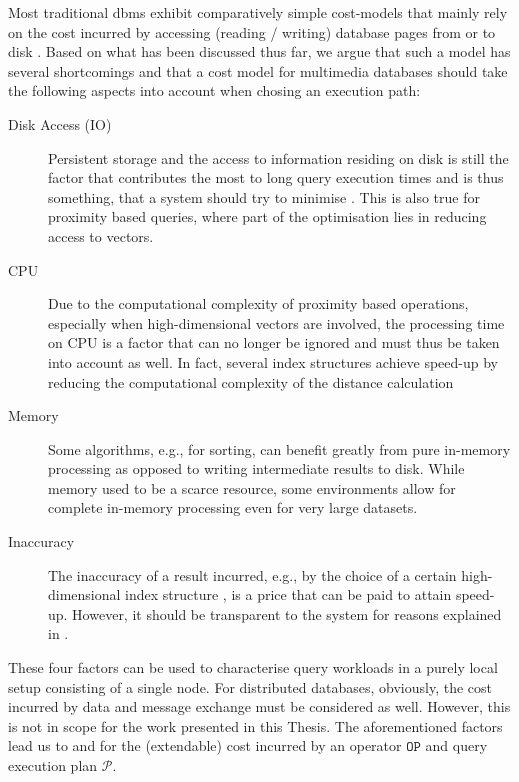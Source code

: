 Most traditional \acrshort{dbms} exhibit comparatively simple cost-models that mainly rely on the cost incurred by accessing (reading / writing) database pages from or to disk . Based on what has been discussed thus far, we argue that such a model has several shortcomings and that a cost model for multimedia databases should take the following aspects into account when chosing an execution path:

\begin{description}
    \item[Disk Access (IO)] Persistent storage and the access to information residing on disk is still the factor that contributes the most to long query execution times and is thus something, that a system should try to minimise \cite{Selinger:1979Access}. This is also true for proximity based queries, where part of the optimisation lies in reducing access to vectors.
    \item[CPU] Due to the computational complexity of proximity based operations, especially when high-dimensional vectors are involved, the processing time on CPU is a factor that can no longer be ignored and must thus be taken into account as well. In fact, several index structures achieve speed-up by reducing the computational complexity of the distance calculation \cite{Weber:1998Va,Jegou:2010Product}
    \item[Memory] Some algorithms, e.g., for sorting, can benefit greatly from pure in-memory processing as opposed to writing intermediate results to disk. While memory used to be a scarce resource, some environments allow for complete in-memory processing even for very large datasets.
    \item[Inaccuracy] The inaccuracy of a result incurred, e.g., by the choice of a certain high-dimensional index structure \cite{Indyk1998:Approximate,Jegou:2010Product}, is a price that can be paid to attain speed-up. However, it should be transparent to the system for reasons explained in .
\end{description}

These four factors can be used to characterise query workloads in a purely local setup consisting of a single node. For distributed databases, obviously, the cost incurred by data and message exchange must be considered as well. However, this is not in scope for the work presented in this Thesis. The aforementioned factors lead us to  and   for the (extendable) cost incurred by an operator $\mathtt{OP}$ and query execution plan $\mathcal{P}$.

